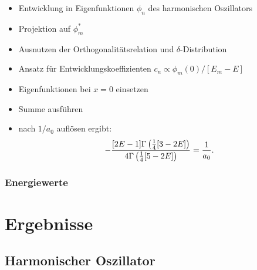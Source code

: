 \documentclass[ngerman, fleqn]{beamer}
\begin{document}
\begin{frame}
    \begin{itemize}
        \item
            Entwicklung in Eigenfunktionen $\phi_n$ des harmonischen Oszillators
        \item
            Projektion auf $\phi_m^*$
        \item
            Ausnutzen der Orthogonalitätsrelation und $\delta$-Distribution
        \item
            Ansatz für Entwicklungskoeffizienten $c_n \propto \phi_m(0)/[E_m - E]$
        \item
            Eigenfunktionen bei $x = 0$ einsetzen
        \item
            Summe ausführen
        \item
            nach $1/a_0$ auflösen ergibt:
            \[
                - \frac{[2E-1]\Gamma\del{\frac 14[3-2E]}}{4 \Gamma\del{\frac
                14[5-2E]}} = \frac1{a_0}.
            \]
    \end{itemize}
\end{frame}

\begin{frame}
    \frametitle{Energiewerte}
    
\end{frame}

\section{Ergebnisse}

\frame\sectionpage

\subsection{Harmonischer Oszillator}
\end{document}
